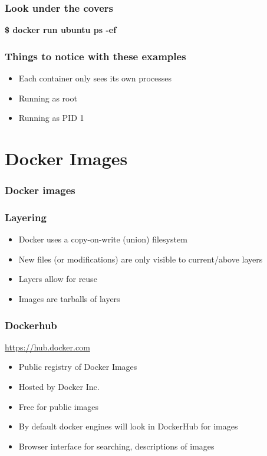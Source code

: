 \documentclass[aspectratio=169,11pt,hyperref={colorlinks=true}]{beamer}
\begin{document}
\begin{frame}
    \frametitle{Look under the covers}
    \textbf{\$ docker run ubuntu ps -ef}
\end{frame}

\begin{frame}
    \frametitle{Things to notice with these examples}
    \begin{itemize}
        \item Each container only sees its own processes
        \item Running as root
        \item Running as PID 1
    \end{itemize}
\end{frame}


\section{Docker Images}
\begin{frame}
    \frametitle{Docker images}
     
\end{frame}

\begin{frame}
    \frametitle{Layering}
    \begin{itemize}
        \item Docker uses a copy-on-write (union) filesystem
        \item New files (or modifications) are only visible to current/above layers
        \item Layers allow for reuse
        \item Images are tarballs of layers
    \end{itemize}
\end{frame}

\begin{frame}
    \frametitle{Dockerhub}
    \href{https:/hub.docker.com}{https://hub.docker.com}
    \begin{itemize}
        \item Public registry of Docker Images
        \item Hosted by Docker Inc.
        \item Free for public images
        \item By default docker engines will look in DockerHub for images
        \item Browser interface for searching, descriptions of images
    \end{itemize}
\end{frame}
\end{document}
